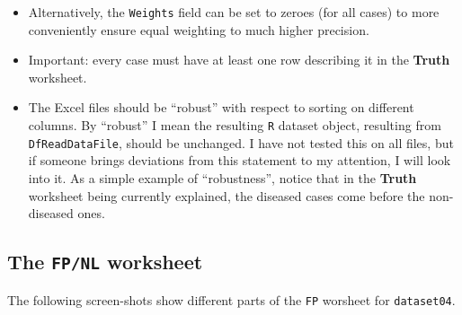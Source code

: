 \documentclass[]{book}
\let\rmarkdownfootnote\footnote%
\def\footnote{\protect\rmarkdownfootnote}
\begin{document}
\begin{itemize}
\texttt{LesionID} = 3. The weights of these lesions are explicitly specified to be 0.33 each. \footnote{The sofware performs a check to ensure that the weight sum to unity, in this case 1\% error is considered close enough for ``government work''!}\\
\item
  Alternatively, the \texttt{Weights} field can be set to zeroes (for all cases) to more conveniently ensure equal weighting to much higher precision.
\item
  Important: every case must have at least one row describing it in the \textbf{Truth} worksheet.
\item
  The Excel files should be ``robust'' with respect to sorting on different columns. By ``robust'' I mean the resulting \texttt{R} dataset object, resulting from \texttt{DfReadDataFile}, should be unchanged. I have not tested this on all files, but if someone brings deviations from this statement to my attention, I will look into it. As a simple example of ``robustness'', notice that in the \textbf{Truth} worksheet being currently explained, the diseased cases come before the non-diseased ones.
\end{itemize}

\hypertarget{the-fpnl-worksheet}{%
\subsection{\texorpdfstring{The \texttt{FP/NL} worksheet}{The FP/NL worksheet}}\label{the-fpnl-worksheet}}

The following screen-shots show different parts of the \texttt{FP} worsheet for \texttt{dataset04}.
\end{document}
